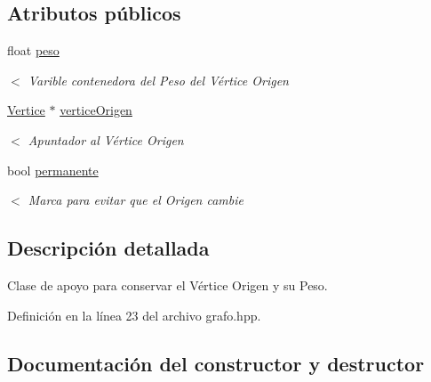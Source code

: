 \subsection*{Atributos públicos}
\begin{DoxyCompactItemize}
\item 
\mbox{\label{classEtiqueta_a6cb53a3db11a5f79617642d5a3b1a2fa}} 
float \hyperlink{classEtiqueta_a6cb53a3db11a5f79617642d5a3b1a2fa}{peso}
\begin{DoxyCompactList}\small\item\em $<$ Varible contenedora del Peso del Vértice Origen \end{DoxyCompactList}\item 
\mbox{\label{classEtiqueta_abbc7c11fe50bd7ae2a34949e10e66fff}} 
\hyperlink{classVertice}{Vertice} $\ast$ \hyperlink{classEtiqueta_abbc7c11fe50bd7ae2a34949e10e66fff}{vertice\+Origen}
\begin{DoxyCompactList}\small\item\em $<$ Apuntador al Vértice Origen \end{DoxyCompactList}\item 
\mbox{\label{classEtiqueta_aa69958b23c24051acace2d464be55de4}} 
bool \hyperlink{classEtiqueta_aa69958b23c24051acace2d464be55de4}{permanente}
\begin{DoxyCompactList}\small\item\em $<$ Marca para evitar que el Origen cambie \end{DoxyCompactList}\end{DoxyCompactItemize}


\subsection{Descripción detallada}
Clase de apoyo para conservar el Vértice Origen y su Peso. 

Definición en la línea 23 del archivo grafo.\+hpp.



\subsection{Documentación del constructor y destructor}
\mbox{\label{classEtiqueta_aa7f1cc55f5fed8f31cc176d375544349}} 
